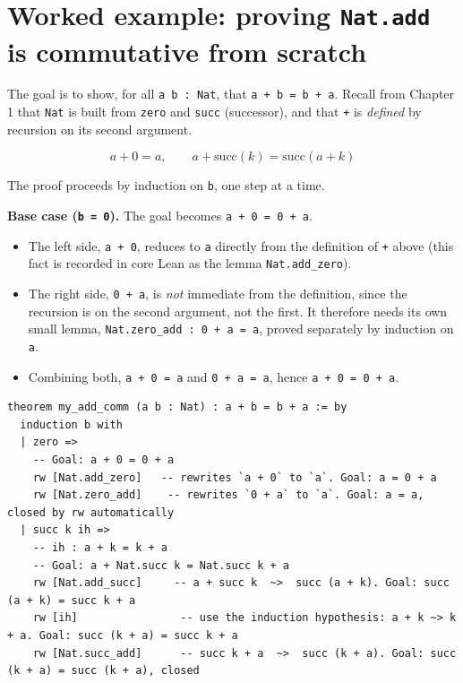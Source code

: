 \section{\texorpdfstring{Worked example: proving \texttt{Nat.add} is commutative from scratch}{Worked example: proving Nat.add is commutative from scratch}}\label{sec:04-tactics:05-worked-example:1}

The goal is to show, for all \texttt{a b : Nat}, that \texttt{a + b = b + a}. Recall from Chapter 1 that \texttt{Nat} is built from \texttt{zero} and \texttt{succ} (successor), and that \texttt{+} is \emph{defined} by recursion on its second argument.

\[
a + 0 = a, \qquad a + \mathrm{succ}(k) = \mathrm{succ}(a + k)
\]

The proof proceeds by induction on \texttt{b}, one step at a time.

\textbf{Base case (\texttt{b = 0}).} The goal becomes \texttt{a + 0 = 0 + a}.

\begin{itemize}
\tightlist
\item
  The left side, \texttt{a + 0}, reduces to \texttt{a} directly from the definition of \texttt{+} above (this fact is recorded in core Lean as the lemma \texttt{Nat.add\_\allowbreak{}zero}).
\item
  The right side, \texttt{0 + a}, is \emph{not} immediate from the definition, since the recursion is on the second argument, not the first. It therefore needs its own small lemma, \texttt{Nat.zero\_\allowbreak{}add : 0 + a = a}, proved separately by induction on \texttt{a}.
\item
  Combining both, \texttt{a + 0 = a} and \texttt{0 + a = a}, hence \texttt{a + 0 = 0 + a}.
\end{itemize}

\begin{lstlisting}
theorem my_add_comm (a b : Nat) : a + b = b + a := by
  induction b with
  | zero =>
    -- Goal: a + 0 = 0 + a
    rw [Nat.add_zero]   -- rewrites `a + 0` to `a`. Goal: a = 0 + a
    rw [Nat.zero_add]    -- rewrites `0 + a` to `a`. Goal: a = a, closed by rw automatically
  | succ k ih =>
    -- ih : a + k = k + a
    -- Goal: a + Nat.succ k = Nat.succ k + a
    rw [Nat.add_succ]     -- a + succ k  ~>  succ (a + k). Goal: succ (a + k) = succ k + a
    rw [ih]                -- use the induction hypothesis: a + k ~> k + a. Goal: succ (k + a) = succ k + a
    rw [Nat.succ_add]      -- succ k + a  ~>  succ (k + a). Goal: succ (k + a) = succ (k + a), closed
\end{lstlisting}

